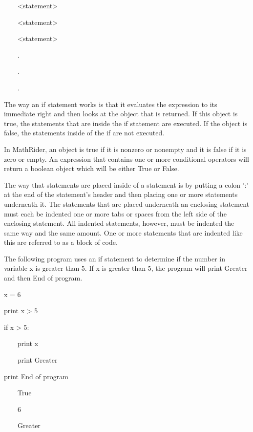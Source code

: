\documentclass[12pt,oneside]{book}
\begin{document}
\ \ \ \ {\textless}statement{\textgreater}

\ \ \ \ {\textless}statement{\textgreater}

\ \ \ \ {\textless}statement{\textgreater}

\ \ \ \ .

\ \ \ \ .

\ \ \ \ .


The way an if statement works is that it evaluates the expression to its immediate right and then looks at the object that is returned. If this object is {\textquotedbl}true{\textquotedbl}, the statements that are inside the if statement are executed. If the object is {\textquotedbl}false{\textquotedbl}, the statements inside of the if are not executed. 

In MathRider, an object is {\textquotedbl}true{\textquotedbl} if it is nonzero or nonempty and it is {\textquotedbl}false{\textquotedbl} if it is zero or empty. An expression that contains one or more conditional operators will return a boolean object which will be either True or False. 

The way that statements are placed inside of a statement is by putting a colon ':' at the end of the statement's header and then placing one or more statements underneath it. The statements that are placed underneath an enclosing statement must each be indented one or more tabs or spaces from the left side of the enclosing statement. All indented statements, however, must be indented the same way and the same amount. One or more statements that are indented like this are referred to as a block of code. 

The following program uses an if statement to determine if the number in variable x is greater than 5. If x is greater than 5, the program will print {\textquotedbl}Greater{\textquotedbl} and then {\textquotedbl}End of program{\textquotedbl}. 

x = 6


print x {\textgreater} 5


if x {\textgreater} 5:

\ \ \ \ print x

\ \ \ \ print {\textquotedbl}Greater{\textquotedbl}


print {\textquotedbl}End of program{\textquotedbl}

{\textbar}

\ \ \ \ True

\ \ \ \ 6

\ \ \ \ Greater
\end{document}
